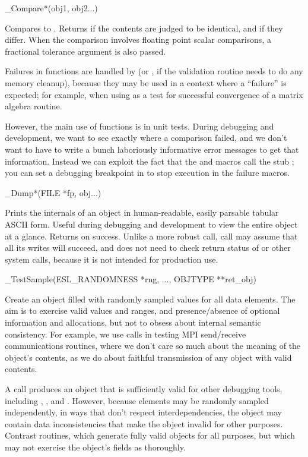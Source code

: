\begin{sreapi}
\hypertarget{ifc:Compare}
{\item[\_Compare*(obj1, obj2...)]}

Compares  to . Returns  if the
contents are judged to be identical, and  if they
differ. When the comparison involves floating point scalar
comparisons, a fractional tolerance argument  is also
passed. 

Failures in  functions are handled by
 (or , if the validation
routine needs to do any memory cleanup), because they may be used in a
context where a ``failure'' is expected; for example, when using
 as a test for successful convergence
of a matrix algebra routine. 

However, the main use of  functions is in unit
tests. During debugging and development, we want to see exactly where
a comparison failed, and we don't want to have to write a bunch
laboriously informative error messages to get that information.
Instead we can exploit the fact that the  and
 macros call the stub ; you can
set a debugging breakpoint in  to stop execution in
the failure macros.

\hypertarget{ifc:Dump}
{\item[\_Dump*(FILE *fp, obj...)]}

Prints the internals of an object in human-readable, easily parsable
tabular ASCII form. Useful during debugging and development to view
the entire object at a glance. Returns  on success.
Unlike a more robust  call,  call may
assume that all its writes will succeed, and does not need to check
return status of  or other system calls, because it
is not intended for production use.


\hypertarget{ifc:TestSample}
{\item[\_TestSample(ESL\_RANDOMNESS *rng, ..., OBJTYPE **ret\_obj)]}

Create an object filled with randomly sampled values for all data
elements. The aim is to exercise valid values and ranges, and
presence/absence of optional information and allocations, but not to
obsess about internal semantic consistency. For example, we use
 calls in testing MPI send/receive
communications routines, where we don't care so much about the meaning
of the object's contents, as we do about faithful transmission of any
object with valid contents. 

A  call produces an object that is sufficiently
valid for other debugging tools, including ,
, and . However, because
elements may be randomly sampled independently, in ways that don't
respect interdependencies, the object may contain data inconsistencies
that make the object invalid for other purposes.  Contrast
 routines, which generate fully valid objects for
all purposes, but which may not exercise the object's fields as
thoroughly.

\end{sreapi}

